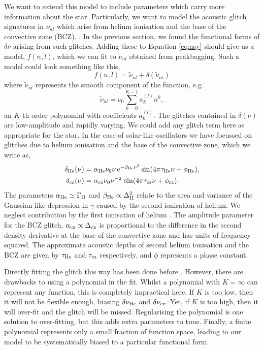 We want to extend this model to include parameters which carry more information about the star. Particularly, we want to model the acoustic glitch signatures in \(\nu_{nl}\) which arise from helium ionisation and the base of the convective zone (BCZ). . In the previous section, we found the functional forms of \(\delta\nu\) arising from such glitches. Adding these to Equation \ref{eq:asy} should give us a model, \(f(n, l)\), which we can fit to \(\nu_{nl}\) obtained from peakbagging. Such a model could look something like this,
%
\begin{equation}
    f(n, l) = \tilde{\nu}_{nl} + \delta(\tilde{\nu}_{nl})
\end{equation}
%
where \(\tilde{\nu}_{nl}\) represents the smooth component of the function, e.g.
%
\begin{equation}
    \tilde{\nu}_{nl} = \nu_0 \sum_{k=0}^{K-1} a_k^{(l)} n^k,
\end{equation}
%
an \(K\)-th order polynomial with coefficients \(a_k^{(l)}\). The glitches contained in \(\delta(\nu)\) are low-amplitude and rapidly varying. We could add any glitch term here as appropriate for the star. In the case of solar-like oscillators we have focussed on glitches due to helium ionisation and the base of the convective zone, which we write as,
%
\begin{align}
    \delta_{{\mathrm{He}}}(\nu) &= \alpha_{{\mathrm{He}}} \nu_0 \nu \, \mathrm{e}^{-\beta_{{\mathrm{He}}} \nu^2} \sin(4\pi\tau_{{\mathrm{He}}}\nu + \phi_{{\mathrm{He}}}),\\
    \delta_{{\mathrm{cz}}}(\nu) &= \alpha_{{\mathrm{cz}}} \nu_0 \nu^{-2} \, \sin(4\pi\tau_{{\mathrm{cz}}}\nu + \phi_{{\mathrm{cz}}}).
\end{align}
%
The parameters \(\alpha_{{\mathrm{He}}} \simeq \Gamma_{{\mathrm{II}}}\) and \(\beta_{{\mathrm{He}}} \propto \Delta_{{\mathrm{II}}}^2\) relate to the area and variance of the Gaussian-like depression in \(\gamma\) caused by the second ionisation of helium. We neglect contribution by the first ionisation of helium . The amplitude parameter for the BCZ glitch, \(\alpha_{{\mathrm{cz}}} \propto \Delta_{{\mathrm{cz}}}\) is proportional to the difference in the second density derivative at the base of the convective zone and has units of frequency squared. The approximate acoustic depths of second helium ionisation and the BCZ are given by \(\tau_{{\mathrm{He}}}\) and \(\tau_{{\mathrm{cz}}}\) respectively, and \(\phi\) represents a phase constant.

Directly fitting the glitch this way has been done before \citep[e.g.][]{Verma.Raodeo.ea2019}. However, there are drawbacks to using a polynomial in the fit. Whilst a polynomial with \(K = \infty\) can represent any function, this is completely impractical here. If \(K\) is too low, then it will not be flexible enough, biasing \(\delta\nu_{{\mathrm{He}}}\) and \(\delta\nu_{{\mathrm{cz}}}\). Yet, if \(K\) is too high, then it will over-fit and the glitch will be missed. Regularising the polynomial is one solution to over-fitting, but this adds extra parameters to tune. Finally, a finite polynomial represents only a small fraction of function space, leading to our model to be systematically biased to a particular functional form.

